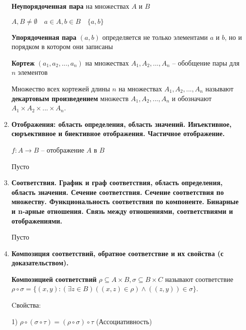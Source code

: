 \documentclass[]{article}
\begin{document}
\begin{enumerate}
\hrulefill

\textbf{Неупорядоченная пара} на множествах $A$ и $B$ 

$A,B \neq \emptyset \quad a \in A, b \in B \quad \{a,b\}$

\textbf{Упорядоченная пара} $(a,b)$ определяется не только элементами $a$ и $b$, но и порядком в котором они записаны 

\textbf{Кортеж} $(a_1,a_2,...,a_n)$ на множествах $A_1,A_2,...,A_n$ -- обобщение пары для $n$ элементов

Множество всех кортежей длины $n$ на множествах $A_1,A_2,...,A_n$ называют \textbf{декартовым произведением} множеств $A_1,A_2,...,A_n$ и обозначают  $A_1 \times A_2 \times ... \times A_n$.

\hrulefill

\item %
\textbf{Отображения: область определения, область значений. Инъективное, сюръективное и биективное отображения. Частичное отображение.}

\hrulefill

$f: A \rightarrow B$ -- отображение $A$ в $B$

{\color{red} Пусто}

\hrulefill
\item %
\textbf{Соответствия. График и граф соответствия, область определения, область значения. Сечение соответствия. Сечение соответствия по множеству. Функциональность соответствия по компоненте. Бинарные и n-арные отношения. Связь между отношениями, соответствиями и отображениями.}

\hrulefill

{\color{red} Пусто}

\hrulefill
\item %
\textbf{Композиция соответствий, обратное соответствие и их свойства (с доказательством).}

\hrulefill

\textbf{Композицией соответствий} 
$\rho \subseteq A \times B, \sigma \subseteq B \times C$ 
называют соответствие 
$\rho \circ \sigma = \{ (x,y): (\exists z \in B) ((x,z) \in \rho) \land ((z,y)) \in \sigma \} $.

Cвойства:

1) $\rho \circ (\sigma \circ \tau) = (\rho \circ \sigma) \circ \tau $ (Ассоциативность)


\end{enumerate}
\end{document}
